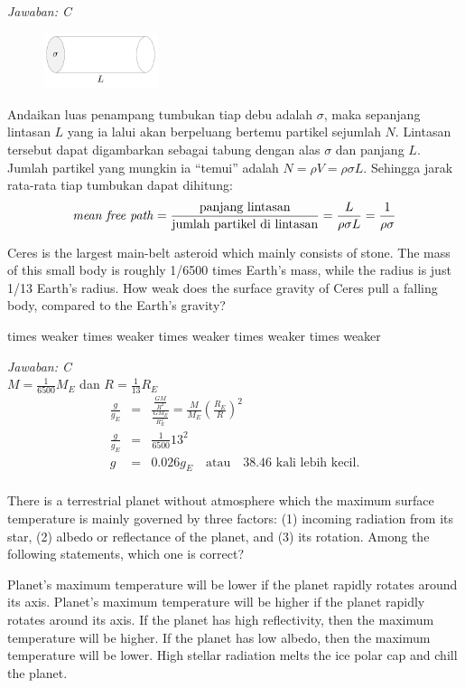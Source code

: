 \documentclass[11pt,fleqn]{exam}
\begin{document}
\begin{questions}
\textit{Jawaban: C}\\
\begin{figure}[H]
\centering
\includegraphics[width=0.3\textwidth]{gambar/mfp.pdf}
\end{figure}
Andaikan luas penampang tumbukan tiap debu adalah $\sigma$, maka sepanjang lintasan $L$ yang ia lalui akan berpeluang bertemu partikel sejumlah $N$. Lintasan tersebut dapat digambarkan sebagai tabung dengan alas $\sigma$ dan panjang $L$. Jumlah partikel yang mungkin ia ``temui'' adalah $N = \rho V = \rho \sigma L $. Sehingga jarak rata-rata tiap tumbukan dapat dihitung:
\begin{eqnarray*}
\text{\textit{mean free path}} = \frac{\text{panjang lintasan}}{\text{jumlah partikel di lintasan}} = \frac{L}{\rho \sigma L} = \frac{1}{\rho \sigma} \\
\end{eqnarray*}


\question Ceres is the largest main-belt asteroid which mainly consists of stone. The mass of this small body is roughly 1/6500 times Earth's mass, while the radius is just 1/13 Earth's radius. How weak does the surface gravity of Ceres pull a falling body, compared to the Earth's gravity?
\begin{choices}
 times weaker
 times weaker
 times weaker
 times weaker
 times weaker
\end{choices}

\textit{Jawaban: C}\\
$M = \frac{1}{6500} M_{E}$ dan $R = \frac{1}{13} R_{E}$
\begin{eqnarray*}
\frac{g}{g_{E}} &=& \frac{\frac{GM}{R^2}}{\frac{GM_{E}}{R_{E}^2}} = \frac{M}{M_{E}} \left( \frac{R_{E}}{R} \right)^{2}\\
\frac{g}{g_{E}} &=& \frac{1}{6500} 13^{2}\\
g &=& 0.026 g_{E} \quad \text{atau}  \quad \text{38.46 kali lebih kecil.}\\
\end{eqnarray*}


\question There is a terrestrial planet without atmosphere which the maximum surface temperature is mainly governed by three factors: (1) incoming radiation from its star, (2) albedo or reflectance of the planet, and (3) its rotation. Among the following statements, which one is correct?
\begin{choices}
\choice Planet's maximum temperature will be lower if the planet rapidly rotates around its axis.
\choice Planet's maximum temperature will be higher if the planet rapidly rotates around its axis.
\choice If the planet has high reflectivity, then the maximum temperature will be higher.
\choice If the planet has low albedo, then the maximum temperature will be lower.
\choice High stellar radiation melts the ice polar cap and chill the planet.
\end{choices}


\end{questions}
\end{document}

